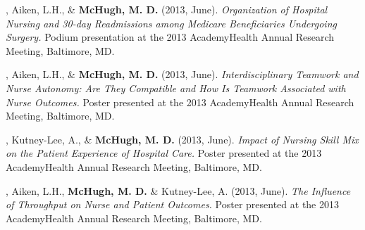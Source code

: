 \documentclass[10pt,]{article}
\begin{document}
{{{{{{{{{{{{{{{\vspace{4mm}

\begin{hangparas}{.25in}{1}

, Aiken, L.H., \& {\textbf {McHugh, M. D.}} (2013, June). {\textit {Organization of Hospital Nursing and 30-day Readmissions among Medicare Beneficiaries Undergoing Surgery.}} Podium presentation at the 2013 AcademyHealth Annual Research Meeting, Baltimore, MD.

\end{hangparas}

\vspace{4mm}

\begin{hangparas}{.25in}{1}

, Aiken, L.H., \& {\textbf {McHugh, M. D.}} (2013, June). {\textit {Interdisciplinary Teamwork and Nurse Autonomy: Are They Compatible and How Is Teamwork Associated with Nurse Outcomes.}} Poster presented at the 2013 AcademyHealth Annual Research Meeting, Baltimore, MD.

\end{hangparas}

\vspace{4mm}

\begin{hangparas}{.25in}{1}

, Kutney-Lee, A., \& {\textbf {McHugh, M. D.}} (2013, June). {\textit {Impact of Nursing Skill Mix on the Patient Experience of Hospital Care.}} Poster presented at the 2013 AcademyHealth Annual Research Meeting, Baltimore, MD.

\end{hangparas}

\vspace{4mm}

\begin{hangparas}{.25in}{1}

, Aiken, L.H., {\textbf {McHugh, M. D.}} \& Kutney-Lee, A. (2013, June). {\textit {The Influence of Throughput on Nurse and Patient Outcomes.}} Poster presented at the 2013 AcademyHealth Annual Research Meeting, Baltimore, MD.

\end{hangparas}

\vspace{4mm}

\begin{hangparas}{.25in}{1}


\end{hangparas}}}}}}}}}}}}}}}}
\end{document}

